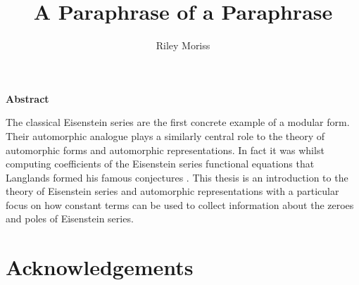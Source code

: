 \documentclass[10pt, openany]{book}
\title{A Paraphrase of a Paraphrase}
\author{Riley Moriss}
\numberwithin{equation}{section}
\begin{document}
\begin{comment}
	\begin{titlepage}
		\begin{center}
			\vspace*{1cm}
			\huge
			\textbf{A Paraphrase of a Paraphrase}\\
			\vspace{2cm}
			\Large
			\text{Riley Moriss}\\
			\vspace{0.5cm}
			\text{Supervisor: Dr. Chenyan Wu }\\    
			
			A thesis submitted in partial fulfillment of the\\
			requirements for the degree of\\
			Master of Science\\
			in the\\
			School of Mathematics and Statistics\\
			at\\
			The University of Melbourne\\
			\vspace{1,5cm}
			October 2024
		\end{center}
	\end{titlepage}
	
	\pagebreak
\end{comment}


\begin{center}
	\textbf{Abstract}
\end{center}

The classical Eisenstein series are the first concrete example of a modular form. Their automorphic analogue plays a similarly central role to the theory of automorphic forms and automorphic representations. In fact it was whilst computing coefficients of the Eisenstein series functional equations that Langlands formed his famous conjectures \cite[Ch VI. Funktorialität in der Theorie der automorphen Formen, Sec. 5 Wieder Princeton]{dumbaughEmilArtinClass2015}. This thesis is an introduction to the theory of Eisenstein series and automorphic representations with a particular focus on how constant terms can be used to collect information about the zeroes and poles of Eisenstein series. 



\chapter*{Acknowledgements}

\end{document}
